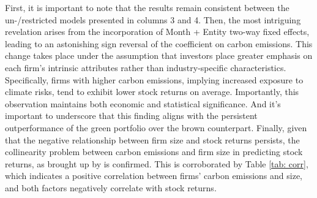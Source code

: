 \documentclass[12pt]{article}
\begin{document}
First, it is important to note that the results remain consistent between the un-/restricted models presented in columns 3 and 4. Then, the most intriguing revelation arises from the incorporation of Month + Entity two-way fixed effects, leading to an astonishing sign reversal of the coefficient on carbon emissions. This change takes place under the assumption that investors place greater emphasis on each firm's intrinsic attributes rather than industry-specific characteristics. Specifically, firms with higher carbon emissions, implying increased exposure to climate risks, tend to exhibit lower stock returns on average. Importantly, this observation maintains both economic and statistical significance. And it's important to underscore that this finding aligns with the persistent outperformance of the green portfolio over the brown counterpart. Finally, given that the negative relationship between firm size and stock returns persists, the collinearity problem between carbon emissions and firm size in predicting stock returns, as brought up by \cite{aswani2023carbon} is confirmed. This is corroborated by Table \ref{tab: corr}, which indicates a positive correlation between firms' carbon emissions and size, and both factors negatively correlate with stock returns.
\end{document}
